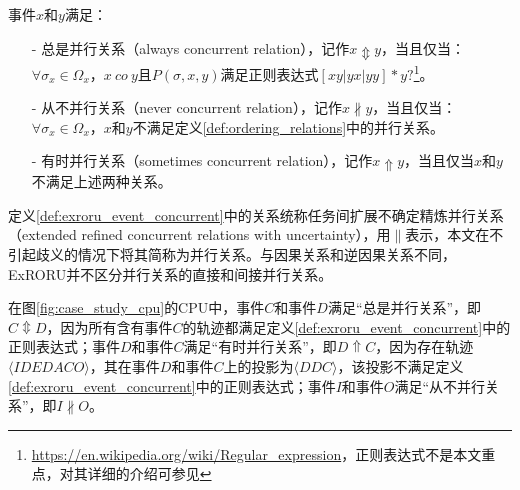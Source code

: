 \begin{definition}[事件间扩展不确定精炼并行关系]\label{def:exroru_event_concurrent}
事件$x$和$y$满足：
  \begin{itemize}
  	\item[-] 总是并行关系（always concurrent relation），记作$x\Updownarrow y$，当且仅当：$\forall\sigma_{x}\in\Omega_{x}$，$x~co~y$且$P(\sigma,x,y)$满足正则表达式$[xy|yx|yy]*y?$\footnote{\url{https://en.wikipedia.org/wiki/Regular\_expression}，正则表达式不是本文重点，对其详细的介绍可参见}。
  	\item[-] 从不并行关系（never concurrent relation），记作$x\nparallel y$，当且仅当：$\forall\sigma_{x}\in\Omega_{x}$，$x$和$y$不满足定义\ref{def:ordering_relations}中的并行关系。
  	\item[-] 有时并行关系（sometimes concurrent relation），记作$x\Uparrow y$，当且仅当$x$和$y$不满足上述两种关系。
  \end{itemize}
\end{definition}

定义\ref{def:exroru_event_concurrent}中的关系统称任务间扩展不确定精炼并行关系（extended refined concurrent relations with uncertainty），用$\parallel$表示，本文在不引起歧义的情况下将其简称为并行关系。与因果关系和逆因果关系不同，ExRORU并不区分并行关系的直接和间接并行关系。

\begin{example}\label{ex:exroru_event_concurrent}
在图\ref{fig:case_study_cpu}的CPU中，事件$C$和事件$D$满足“总是并行关系”，即$C\Updownarrow D$，因为所有含有事件$C$的轨迹都满足定义\ref{def:exroru_event_concurrent}中的正则表达式；事件$D$和事件$C$满足“有时并行关系”，即$D\Uparrow C$，因为存在轨迹$\langle IDEDACO\rangle$，其在事件$D$和事件$C$上的投影为$\langle DDC\rangle$，该投影不满足定义\ref{def:exroru_event_concurrent}中的正则表达式；事件$I$和事件$O$满足“从不并行关系”，即$I\nparallel O$。
\end{example}

